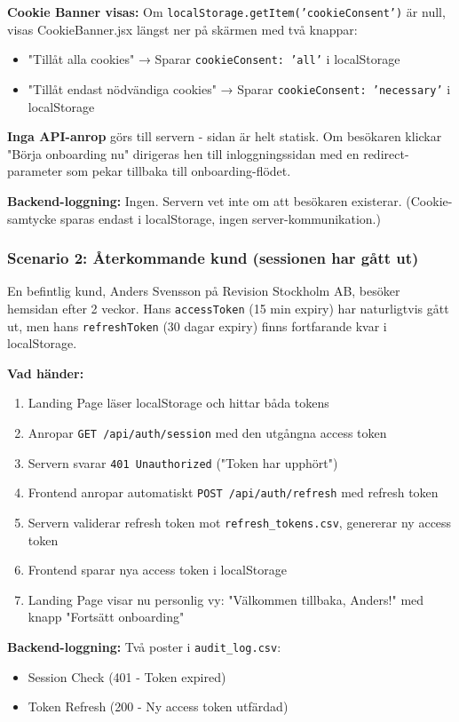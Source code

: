\documentclass[12pt,a4paper]{article}
\begin{document}
\textbf{Cookie Banner visas:} Om \texttt{localStorage.getItem('cookieConsent')} är null, visas CookieBanner.jsx längst ner på skärmen med två knappar:
\begin{itemize}[noitemsep]
  \item "Tillåt alla cookies" → Sparar \texttt{cookieConsent: 'all'} i localStorage
  \item "Tillåt endast nödvändiga cookies" → Sparar \texttt{cookieConsent: 'necessary'} i localStorage
\end{itemize}

\textbf{Inga API-anrop} görs till servern - sidan är helt statisk. Om besökaren klickar "Börja onboarding nu" dirigeras hen till inloggningssidan med en redirect-parameter som pekar tillbaka till onboarding-flödet.

\textbf{Backend-loggning:} Ingen. Servern vet inte om att besökaren existerar. (Cookie-samtycke sparas endast i localStorage, ingen server-kommunikation.)

\subsubsection{Scenario 2: Återkommande kund (sessionen har gått ut)}
En befintlig kund, Anders Svensson på Revision Stockholm AB, besöker hemsidan efter 2 veckor. Hans \texttt{accessToken} (15 min expiry) har naturligtvis gått ut, men hans \texttt{refreshToken} (30 dagar expiry) finns fortfarande kvar i localStorage.

\textbf{Vad händer:}
\begin{enumerate}[noitemsep]
  \item Landing Page läser localStorage och hittar båda tokens
  \item Anropar \texttt{GET /api/auth/session} med den utgångna access token
  \item Servern svarar \texttt{401 Unauthorized} ("Token har upphört")
  \item Frontend anropar automatiskt \texttt{POST /api/auth/refresh} med refresh token
  \item Servern validerar refresh token mot \texttt{refresh\_tokens.csv}, genererar ny access token
  \item Frontend sparar nya access token i localStorage
  \item Landing Page visar nu personlig vy: "Välkommen tillbaka, Anders!" med knapp "Fortsätt onboarding"
\end{enumerate}

\textbf{Backend-loggning:} Två poster i \texttt{audit\_log.csv}:
\begin{itemize}[noitemsep]
  \item Session Check (401 - Token expired)
  \item Token Refresh (200 - Ny access token utfärdad)
\end{itemize}
\end{document}
